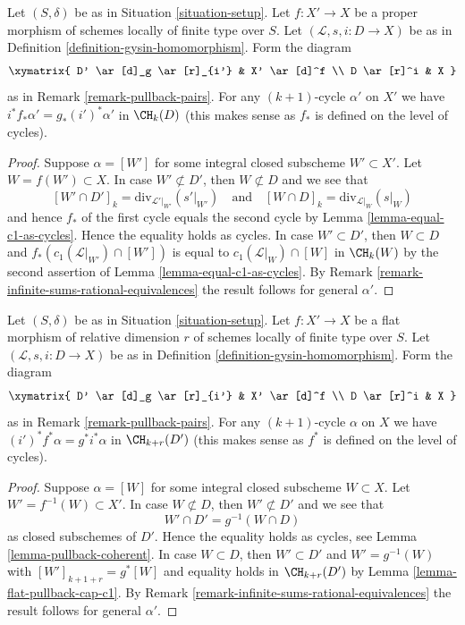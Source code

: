\begin{lemma}
\label{lemma-closed-in-X-gysin}
Let $(S, \delta)$ be as in Situation \ref{situation-setup}.
Let $f : X' \to X$ be a proper morphism of schemes
locally of finite type over $S$.
Let $(\mathcal{L}, s, i : D \to X)$ be as in
Definition \ref{definition-gysin-homomorphism}.
Form the diagram
$$
\xymatrix{
D' \ar[d]_g \ar[r]_{i'} & X' \ar[d]^f \\
D \ar[r]^i & X
}
$$
as in Remark \ref{remark-pullback-pairs}.
For any $(k + 1)$-cycle $\alpha'$ on $X'$ we have
$i^*f_*\alpha' = g_*(i')^*\alpha'$ in $\CH_k(D)$
(this makes sense as $f_*$ is defined on the level of cycles).
\end{lemma}

\begin{proof}
Suppose $\alpha = [W']$ for some integral closed subscheme
$W' \subset X'$. Let $W = f(W') \subset X$. In case $W' \not \subset D'$,
then $W \not \subset D$ and we see that
$$
[W' \cap D']_k = \text{div}_{\mathcal{L}'|_{W'}}({s'|_{W'}})
\quad\text{and}\quad
[W \cap D]_k = \text{div}_{\mathcal{L}|_W}(s|_W)
$$
and hence $f_*$ of the first cycle equals the second cycle by
Lemma \ref{lemma-equal-c1-as-cycles}. Hence the
equality holds as cycles. In case $W' \subset D'$, then
$W \subset D$ and $f_*(c_1(\mathcal{L}|_{W'}) \cap [W'])$
is equal to $c_1(\mathcal{L}|_W) \cap [W]$ in $\CH_k(W)$ by the second
assertion of Lemma \ref{lemma-equal-c1-as-cycles}.
By Remark \ref{remark-infinite-sums-rational-equivalences}
the result follows for general $\alpha'$.
\end{proof}

\begin{lemma}
\label{lemma-gysin-flat-pullback}
Let $(S, \delta)$ be as in Situation \ref{situation-setup}. Let $f : X' \to X$
be a flat morphism of relative dimension $r$ of schemes locally of finite type
over $S$. Let $(\mathcal{L}, s, i : D \to X)$ be as in
Definition \ref{definition-gysin-homomorphism}. Form the diagram
$$
\xymatrix{
D' \ar[d]_g \ar[r]_{i'} & X' \ar[d]^f \\
D \ar[r]^i & X
}
$$
as in Remark \ref{remark-pullback-pairs}.
For any $(k + 1)$-cycle $\alpha$ on $X$ we have
$(i')^*f^*\alpha = g^*i^*\alpha$ in $\CH_{k + r}(D')$
(this makes sense as $f^*$ is defined on the level of cycles).
\end{lemma}

\begin{proof}
Suppose $\alpha = [W]$ for some integral closed subscheme
$W \subset X$. Let $W' = f^{-1}(W) \subset X'$. In case $W \not \subset D$,
then $W' \not \subset D'$ and we see that
$$
W' \cap D' = g^{-1}(W \cap D)
$$
as closed subschemes of $D'$. Hence the
equality holds as cycles, see Lemma \ref{lemma-pullback-coherent}.
In case $W \subset D$, then $W' \subset D'$ and $W' = g^{-1}(W)$
with $[W']_{k + 1 + r} = g^*[W]$ and equality holds in
$\CH_{k + r}(D')$ by Lemma \ref{lemma-flat-pullback-cap-c1}.
By Remark \ref{remark-infinite-sums-rational-equivalences}
the result follows for general $\alpha'$.
\end{proof}








